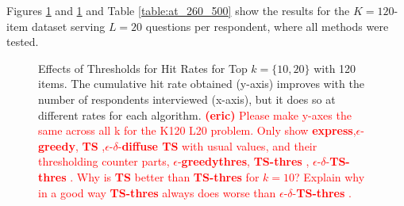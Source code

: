 \documentclass[nonblindrev]{informs3}
\newcommand{\eric}[1]{\textcolor{red}{\textbf{(eric)} #1}}
\newcommand{\fixedexpress}{\textbf{express}}
\newcommand{\egreedy}{$\epsilon$-\textbf{greedy}}
\newcommand{\egreedythres}{$\epsilon$-\textbf{greedythres}}
\newcommand{\ts}{\textbf{TS} }
\newcommand{\edts}{$\epsilon$-$\delta$-\textbf{diffuse TS} }
\newcommand{\tsthres}{\textbf{TS-thres} }
\newcommand{\edtsthres}{$\epsilon$-$\delta$-\textbf{TS-thres} }
\begin{document}
Figures \ref{fig:K120_L20_k3hit_k10hit} and \ref{fig:K120_L20_k3hit_k10hit} and Table \ref{table:at_260_500} show the results for the $K=120$-item dataset serving $L=20$ questions per respondent, where all methods were tested.


\begin{figure}%
    \caption{Effects of Thresholds for Hit Rates for Top $k=\{10,20\}$ with 120 items. The cumulative hit rate obtained (y-axis) improves with the number of respondents interviewed (x-axis), but it does so at different rates for each algorithm. \eric{Please make y-axes the same across all k for the K120 L20 problem. Only show \fixedexpress,\egreedy, \ts,\edts with usual values, and their thresholding counter parts, \egreedythres, \tsthres, \edtsthres. Why is \ts better than \tsthres for $k=10$?  Explain why in a good way \tsthres always does worse than \edtsthres. }}%
    \label{fig:K120_L20_k3hit_k10hit}%
 	\begin{center}
    \qquad
	\end{center}
\end{figure}
\end{document}
